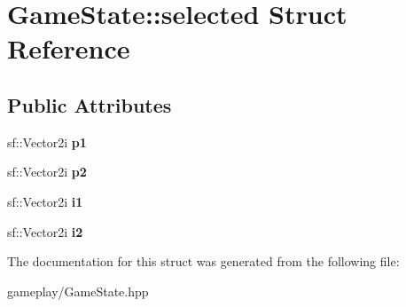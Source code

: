 \hypertarget{structGameState_1_1selected}{\section{\-Game\-State\-:\-:selected \-Struct \-Reference}
\label{structGameState_1_1selected}
}
\subsection*{\-Public \-Attributes}
\begin{DoxyCompactItemize}
\item 
\hypertarget{structGameState_1_1selected_a60109886e876a63609ba7bd0ed0d6225_a60109886e876a63609ba7bd0ed0d6225}{sf\-::\-Vector2i {\bfseries p1}}\label{structGameState_1_1selected_a60109886e876a63609ba7bd0ed0d6225_a60109886e876a63609ba7bd0ed0d6225}

\item 
\hypertarget{structGameState_1_1selected_a46b1b3f6e16c68379a08d6c2ce3d96b5_a46b1b3f6e16c68379a08d6c2ce3d96b5}{sf\-::\-Vector2i {\bfseries p2}}\label{structGameState_1_1selected_a46b1b3f6e16c68379a08d6c2ce3d96b5_a46b1b3f6e16c68379a08d6c2ce3d96b5}

\item 
\hypertarget{structGameState_1_1selected_a8c0598e1c427893c41a9f06a00b17244_a8c0598e1c427893c41a9f06a00b17244}{sf\-::\-Vector2i {\bfseries i1}}\label{structGameState_1_1selected_a8c0598e1c427893c41a9f06a00b17244_a8c0598e1c427893c41a9f06a00b17244}

\item 
\hypertarget{structGameState_1_1selected_a6fefaa6758e5c0a0fec34ad10ab669d3_a6fefaa6758e5c0a0fec34ad10ab669d3}{sf\-::\-Vector2i {\bfseries i2}}\label{structGameState_1_1selected_a6fefaa6758e5c0a0fec34ad10ab669d3_a6fefaa6758e5c0a0fec34ad10ab669d3}

\end{DoxyCompactItemize}


\-The documentation for this struct was generated from the following file\-:\begin{DoxyCompactItemize}
\item 
gameplay/\-Game\-State.\-hpp\end{DoxyCompactItemize}
